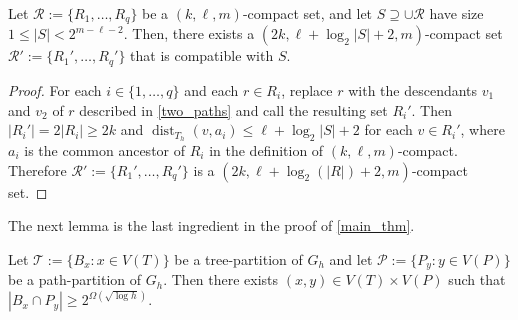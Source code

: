 \documentclass{patmorin}
\DeclareMathOperator{\dist}{dist}
\renewcommand{\le}{\leqslant}
\renewcommand{\ge}{\geqslant}
\begin{document}
\begin{lem}\label{compatible_set}
  Let $\mathcal{R}:=\{R_1,\ldots,R_q\}$ be a $(k,\ell,m)$-compact set,  and let $S\supseteq \cup\mathcal{R}$ have size $1\le |S|< 2^{m-\ell-2}$.  Then, there exists a $(2k,\ell + \log_2|S|+2,m)$-compact set $\mathcal{R}':=\{R_1',\ldots,R_q'\}$ that is compatible with $S$.
\end{lem}

\begin{proof}
  For each $i\in\{1,\ldots,q\}$ and each $r\in R_i$, replace $r$ with the descendants $v_1$ and $v_2$ of $r$ described in \cref{two_paths} and call the resulting set $R_i'$.   Then $|R_i'|=2|R_i|\ge 2k$ and $\dist_{T_h}(v,a_i)\le \ell+\log_2|S|+2$ for each $v\in R_i'$, where $a_i$ is the common ancestor of $R_i$ in the definition of $(k,\ell,m)$-compact.  Therefore $\mathcal{R}':=\{R_1',\ldots,R_q'\}$ is a $(2k,\ell + \log_2(|R|)+2,m)$-compact set.
\end{proof}

The next lemma is the last ingredient in the proof of \cref{main_thm}.
\begin{lem}\label{big_lemma}
  Let $\mathcal{T}:=\{B_x:x\in V(T)\}$ be a tree-partition of $G_h$ and let $\mathcal{P}:=\{P_y:y\in V(P)\}$ be a path-partition of $G_h$.  Then there exists $(x,y)\in V(T)\times V(P)$ such that $|B_x\cap P_y| \ge 2^{\Omega(\sqrt{\log h})}$.
\end{lem}
\end{document}
